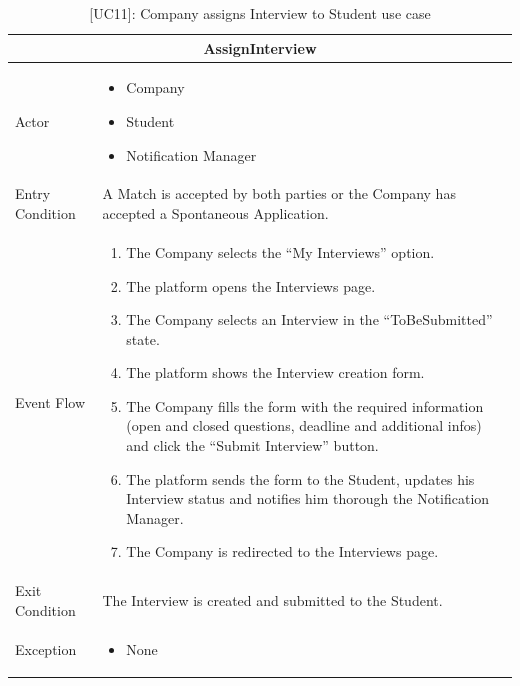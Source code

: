 \begin{table}[H]
    \centering
    \begin{tabular}{|p{3cm}|p{12cm}|}
    \hline
    \multicolumn{2}{|c|}{\textbf{AssignInterview}} \\ \hline
    Actor & 
    \begin{itemize}
        \item Company
        \item Student
        \item Notification Manager
    \end{itemize} \\ \hline
    Entry Condition & A Match is accepted by both parties or the Company has accepted a Spontaneous Application. \\ \hline
    Event Flow &      
    \begin{enumerate}         
        \item The Company selects the “My Interviews” option.
        \item The platform opens the Interviews page.
        \item The Company selects an Interview in the “ToBeSubmitted” state.
        \item The platform shows the Interview creation form.
        \item The Company fills the form with the required information (open and closed questions, deadline and additional infos) and click the “Submit Interview” button.
        \item The platform sends the form to the Student, updates his Interview status and notifies him thorough the Notification Manager.
        \item The Company is redirected to the Interviews page.
    \end{enumerate} \\ \hline
    Exit Condition & The Interview is created and submitted to the Student. \\ \hline
    Exception & 
    \begin{itemize}         
        \item None
    \end{itemize} \\ \hline
    \end{tabular}
    \caption{[UC11]: Company assigns Interview to Student use case}
    \label{tab:UC11}
\end{table}

